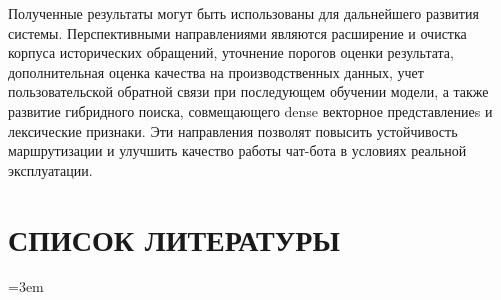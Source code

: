 \documentclass[14pt,a4paper]{extarticle}
\numberwithin{figure}{section}
\numberwithin{table}{section}
\begin{document}
Полученные результаты могут быть использованы для дальнейшего развития
системы. Перспективными направлениями являются расширение и очистка
корпуса исторических обращений, уточнение порогов оценки результата,
дополнительная оценка качества на производственных данных, учет
пользовательской обратной связи при последующем обучении модели, а также
развитие гибридного поиска, совмещающего dense векторное представлениеs и лексические
признаки. Эти направления позволят повысить устойчивость маршрутизации и
улучшить качество работы чат-бота в условиях реальной эксплуатации.


\clearpage
\section*{СПИСОК ЛИТЕРАТУРЫ}
\begingroup
\emergencystretch=3em
\end{document}
